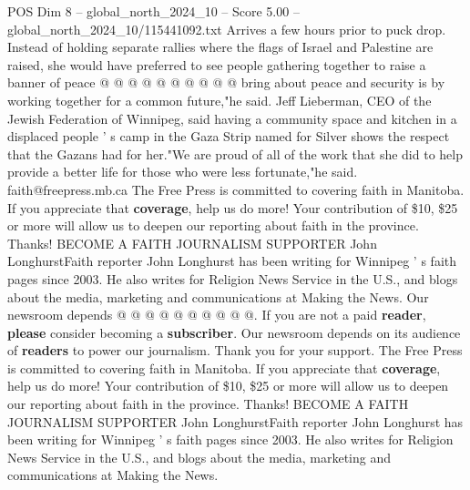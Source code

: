 \begin{textsample}{POS Dim 8 – global\_north\_2024\_10 – Score 5.00 – global\_north\_2024\_10/115441092.txt}
Arrives a few hours prior to puck drop.
Instead of holding separate rallies where the flags of Israel and Palestine are raised, she would have preferred to see people gathering together to raise a banner of peace @ @ @ @ @ @ @ @ @ @ bring about peace and security is by working together for a common future,"he said.
Jeff Lieberman, CEO of the Jewish Federation of Winnipeg, said having a community space and kitchen in a displaced people ' s camp in the Gaza Strip named for Silver shows the respect that the Gazans had for her."We are proud of all of the work that she did to help provide a better life for those who were less fortunate,"he said. faith@freepress.mb.ca The Free Press is committed to covering faith in Manitoba.
If you appreciate that \textbf{coverage}, help us do more!
Your contribution of \$10, \$25 or more will allow us to deepen our reporting about faith in the province.
Thanks!
BECOME A FAITH JOURNALISM SUPPORTER John LonghurstFaith reporter John Longhurst has been writing for Winnipeg ' s faith pages since 2003.
He also writes for Religion News Service in the U.S., and blogs about the media, marketing and communications at Making the News.
Our newsroom depends @ @ @ @ @ @ @ @ @ @.
If you are not a paid \textbf{reader}, \textbf{please} consider becoming a \textbf{subscriber}.
Our newsroom depends on its audience of \textbf{readers} to power our journalism.
Thank you for your support.
The Free Press is committed to covering faith in Manitoba.
If you appreciate that \textbf{coverage}, help us do more!
Your contribution of \$10, \$25 or more will allow us to deepen our reporting about faith in the province.
Thanks!
BECOME A FAITH JOURNALISM SUPPORTER John LonghurstFaith reporter John Longhurst has been writing for Winnipeg ' s faith pages since 2003.
He also writes for Religion News Service in the U.S., and blogs about the media, marketing and communications at Making the News.

\end{textsample}
